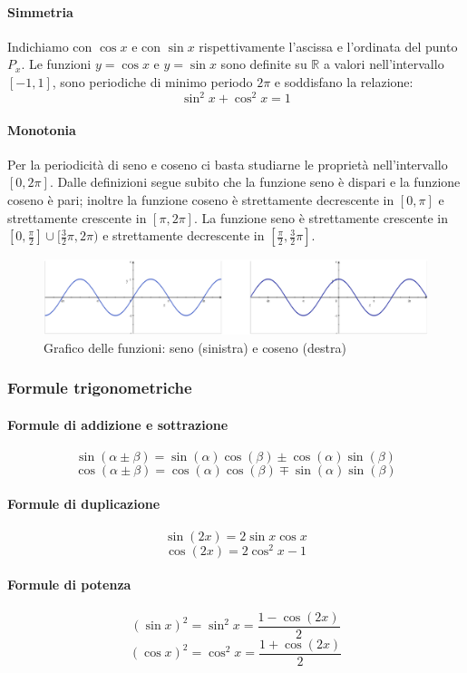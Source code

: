 \documentclass[11pt,a4paper,notitlepage]{report}
\let\numberset\mathbb
\newcommand{\R}{\numberset{R}}
\begin{document}
\paragraph{Simmetria}
Indichiamo con $\cos x$ e con $\sin x$ rispettivamente l'ascissa e l'ordinata del punto $P_x$. Le funzioni $y=\cos x$ e $y=\sin x$ sono definite su $\R$ a valori nell'intervallo $[-1,1]$, sono periodiche di minimo periodo $2\pi$ e soddisfano la relazione:
\[\sin^2 x + \cos^2 x = 1\]

\paragraph{Monotonia} Per la periodicità di seno e coseno ci basta studiarne le proprietà nell'intervallo $[0,2\pi]$. Dalle definizioni segue subito che la funzione seno è dispari e la funzione coseno è pari; inoltre la funzione coseno è strettamente decrescente in $[0,\pi]$ e strettamente crescente in $[\pi,2\pi]$. La funzione seno è strettamente crescente in $[0,\frac{\pi}{2}] \cup [\frac{3}{2}\pi,2\pi)$ e strettamente decrescente in $[\frac{\pi}{2},\frac{3}{2}\pi]$.

\begin{figure}[H]
  \centering
    \includegraphics[width=1\textwidth]{images/senocoseno.png}
  \caption{Grafico delle funzioni: seno (sinistra) e coseno (destra)}
\end{figure}

\subsubsection{Formule trigonometriche}
\paragraph{Formule di addizione e sottrazione}
\[\sin(\alpha\pm\beta)=\sin(\alpha)\cos(\beta)\pm\cos(\alpha)\sin(\beta)\]
\[\cos(\alpha\pm\beta)=\cos(\alpha)\cos(\beta)\mp\sin(\alpha)\sin(\beta)\]
\paragraph{Formule di duplicazione}
\[\sin(2x)=2\sin x\cos x\]
\[\cos(2x)=2\cos^2 x - 1\]
\paragraph{Formule di potenza}
\[(\sin x)^2 = \sin^2 x= \frac{1-\cos(2x)}{2}\]
\[(\cos x)^2 = \cos^2 x= \frac{1+\cos(2x)}{2}\]
\end{document}
